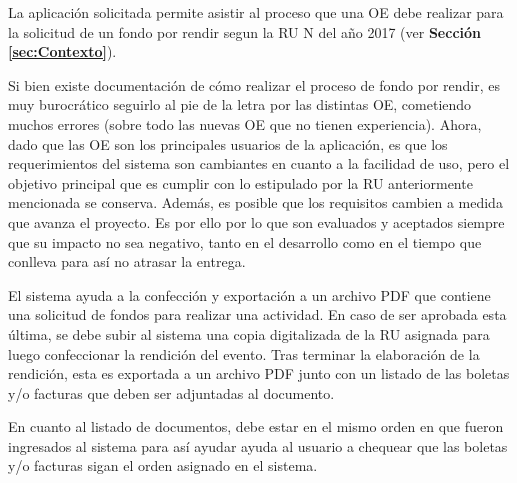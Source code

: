 La aplicación solicitada permite asistir al proceso que una OE debe realizar para la solicitud de un fondo por rendir segun la RU N del año 2017 (ver \textbf{Sección \ref{sec:Contexto}}).

Si bien existe documentación de cómo realizar el proceso de fondo por rendir, es muy burocrático seguirlo al pie de la letra por las distintas OE, cometiendo muchos errores (sobre todo las nuevas OE que no tienen experiencia). Ahora, dado que las OE son los principales usuarios de la aplicación, es que los requerimientos del sistema son cambiantes en cuanto a la facilidad de uso, pero el objetivo principal que es cumplir con lo estipulado por la RU anteriormente mencionada se conserva. Además, es posible que los requisitos cambien a medida que avanza el proyecto. Es por ello por lo que son evaluados y aceptados siempre que su impacto no sea negativo, tanto en el desarrollo como en el tiempo que conlleva para así no atrasar la entrega.

El sistema ayuda a la confección y exportación a un archivo PDF que contiene una solicitud de fondos para realizar una actividad. En caso de ser aprobada esta última, se debe subir al sistema una copia digitalizada de la RU asignada para luego confeccionar la rendición del evento. Tras terminar la elaboración de la rendición, esta es exportada a un archivo PDF junto con un listado de las boletas y/o facturas que deben ser adjuntadas al documento. 

En cuanto al listado de documentos, debe estar en el mismo orden en que fueron ingresados al sistema para así ayudar ayuda al usuario a chequear que las boletas y/o facturas sigan el orden asignado en el sistema.

